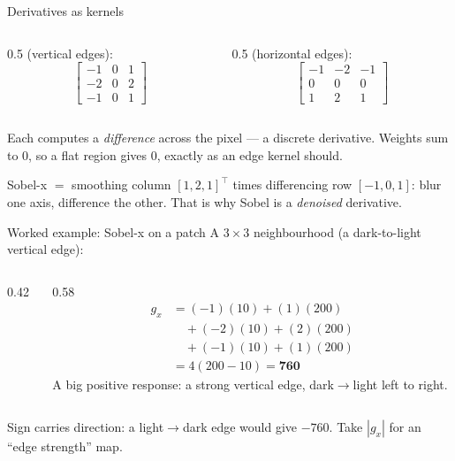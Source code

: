\documentclass[10pt,aspectratio=169]{beamer}
\begin{document}
\begin{frame}{Derivatives as kernels}
  \begin{columns}[T]
    \begin{column}{0.5\textwidth}
       (vertical edges):
      \[\begin{bmatrix}-1&0&1\\-2&0&2\\-1&0&1\end{bmatrix}\]
    \end{column}
    \begin{column}{0.5\textwidth}
       (horizontal edges):
      \[\begin{bmatrix}-1&-2&-1\\0&0&0\\1&2&1\end{bmatrix}\]
    \end{column}
  \end{columns}
  \vspace{4pt}
  Each computes a \emph{difference} across the pixel — a discrete derivative. Weights sum to 0,
  so a flat region gives 0, exactly as an edge kernel should.
  \begin{infobox}[Separable]
    Sobel-x $=$ smoothing column $[1,2,1]^{\!\top}$ times differencing row $[-1,0,1]$: blur one
    axis, difference the other. That is why Sobel is a \emph{denoised} derivative.
  \end{infobox}
\end{frame}

\begin{frame}{Worked example: Sobel-x on a patch}
  A $3\times3$ neighbourhood (a dark-to-light vertical edge):
  \begin{columns}[T]
    \begin{column}{0.42\textwidth}
      \begin{center}
      \end{center}
    \end{column}
    \begin{column}{0.58\textwidth}
      \small
      \begin{align*}
        g_x &= (-1)(10)+(1)(200)\\
            &\quad +(-2)(10)+(2)(200)\\
            &\quad +(-1)(10)+(1)(200)\\
            &= 4(200-10) = \mathbf{760}
      \end{align*}
      A big positive response: a strong vertical edge, dark$\to$light left to right.
    \end{column}
  \end{columns}
  \vspace{2pt}
  \begin{goodbox}
    Sign carries direction: a light$\to$dark edge would give $-760$. Take $|g_x|$ for an
    ``edge strength'' map.
  \end{goodbox}
\end{frame}
\end{document}
